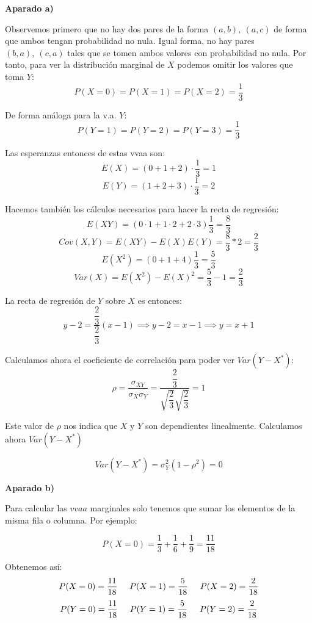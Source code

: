 \documentclass[openany]{book}
\begin{document}
\begin{exercise}
    $  $
    \begin{flushright}
        \textbf{Aparado a)}
    \end{flushright}

    Observemos primero que no hay dos pares de la forma $ (a,b),\ (a,c) $ de forma que ambos tengan probabilidad no nula. Igual forma, no hay pares $ (b,a),\ (c,a) $ tales que se tomen ambos valores con probabilidad no nula. Por tanto, para ver la distribución marginal de $ X $ podemos omitir los valores que toma $ Y $:
    $$ P(X=0) = P(X=1) = P(X=2) = \dfrac{1}{3} $$

    De forma análoga para la v.a. $ Y $: 
    $$ P(Y=1) = P(Y=2) = P(Y=3) = \dfrac{1}{3} $$

    Las esperanzas entonces de estas vvaa son:
    $$ E(X) = (0+1+2)\cdot \dfrac{1}{3} = 1 $$
    $$ E(Y) = (1+2+3)\cdot \dfrac{1}{3} = 2 $$

    Hacemos también los cálculos necesarios para hacer la recta de regresión:
    $$ E(XY) = (0\cdot 1+1\cdot 2+2\cdot 3) \dfrac{1}{3} = \dfrac{8}{3} $$
    $$ Cov(X,Y) = E(XY) - E(X)E(Y) = \dfrac{8}{3}*2 =\dfrac{2}{3} $$
    $$ E(X^2) = (0+1+4)\dfrac{1}{3} = \dfrac{5}{3} $$
    $$ Var(X) = E(X^2)-E(X)^2 = \dfrac{5}{3}-1 = \dfrac{2}{3} $$

    La recta de regresión de $ Y $ sobre $ X $ es entonces:
    $$ y-2 = \dfrac{\dfrac{2}{3}}{\dfrac{2}{3}}(x-1) \implies y -2 = x-1 \implies y = x+1 $$

    Calculamos ahora el coeficiente de correlación para poder ver $ Var(Y-X^{*}) $:
    $$ \rho = \dfrac{\sigma_{XY}}{\sigma_{X}\sigma_{Y}} = \dfrac{\dfrac{2}{3}}{\sqrt{\dfrac{2}{3}}\sqrt{\dfrac{2}{3}}} = 1 $$

    Este valor de $ \rho $ nos indica que $ X $ y $ Y $ son dependientes linealmente. Calculamos ahora $ Var(Y-X^*) $

    $$ Var(Y-X^*) = \sigma_{Y}^2(1-\rho ^2) = 0 $$

    \begin{flushright}
        \textbf{Aparado b)}
    \end{flushright}

    Para calcular las $ vvaa $ marginales solo tenemos que sumar los elementos de la misma fila o columna. Por ejemplo:

    $$ P(X=0) = \dfrac{1}{3}+\dfrac{1}{6}+\dfrac{1}{9} = \dfrac{11}{18} $$

    Obtenemos así:
    $$ P(X=0) = \dfrac{11}{18} \hspace{5mm} P(X=1) = \dfrac{5}{18} \hspace{5mm} P(X=2) = \dfrac{2}{18}$$
    $$ P(Y=0) = \dfrac{11}{18} \hspace{5mm} P(Y=1) = \dfrac{5}{18} \hspace{5mm} P(Y=2) = \dfrac{2}{18} $$


\end{exercise}
\end{document}
